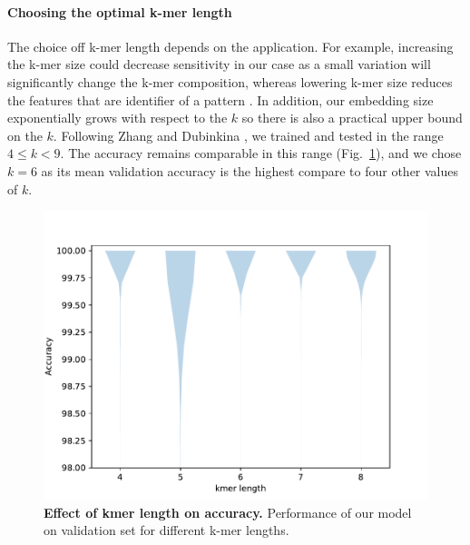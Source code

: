 \paragraph{Choosing the optimal k-mer length}
The choice off k-mer length depends on the application. For example, increasing the k-mer size could decrease sensitivity in our case as a small variation will significantly change the k-mer composition, whereas lowering k-mer size reduces the features that are identifier of a pattern \cite{Zhang2017}. In addition, our embedding size exponentially grows with respect to the $k$ so there is also a practical upper bound on the $k$. Following Zhang  and Dubinkina , we trained and tested in the range $4\le k<9$. The accuracy remains comparable in this range (Fig.~\ref{fig:kmer_length}), and we chose $k=6$ as its mean validation accuracy is the highest compare to four other values of $k$.
\begin{figure}[ht]
\vskip -0.11in
\begin{center}
\centerline{\includegraphics[width=\columnwidth]{fig/kmer_length.pdf}}
\caption{\footnotesize{\bf Effect of kmer length on accuracy.}
 Performance of our model on validation set for different k-mer lengths.}
  \label{fig:kmer_length}
\end{center}
\vspace{-0.3in}
\end{figure}

